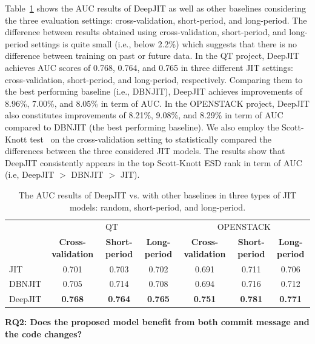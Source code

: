 Table~\ref{tab:results} shows the AUC results of DeepJIT as well as other baselines considering the three evaluation settings: cross-validation, short-period, and long-period. The difference between results obtained using cross-validation, short-period, and long-period settings is quite small (i.e., below 2.2\%) which suggests that there is no difference between training on past or future data. 
In the QT project, DeepJIT achieves AUC scores of 0.768, 0.764, and 0.765 in three different JIT settings: cross-validation, short-period, and long-period, respectively. Comparing them to the best performing baseline (i.e., DBNJIT), DeepJIT achieves improvements of 8.96\%, 7.00\%, and 8.05\% in term of AUC. In the OPENSTACK project, DeepJIT also constitutes improvements of 8.21\%, 9.08\%, and 8.29\% in term of AUC compared to DBNJIT (the best performing baseline). We also employ the Scott-Knott test~\cite{ghotra2015revisiting} on the cross-validation setting to statistically compared the differences between the three considered JIT models. The results show that DeepJIT consistently appears in the top Scott-Knott ESD rank in term of AUC (i.e, DeepJIT $>$ DBNJIT $>$ JIT).  

\begin{table}[t!]
	\centering
	\caption{The AUC results of DeepJIT vs. with other baselines in three types of JIT models: random, short-period, and long-period.}
	\begin{tabular}{|l|c|c|c|c|c|c|}
		\hline
		\multirow{2}[4]{*}{} & \multicolumn{3}{c|}{QT} & \multicolumn{3}{c|}{OPENSTACK} \\
		\cline{2-7}          & \textbf{Cross-validation} & \textbf{Short-period} & \textbf{Long-period} & \textbf{Cross-validation} & \textbf{Short-period} & \textbf{Long-period} \\
		\hline
		\hline
		JIT   & 0.701 & 0.703 & 0.702 & 0.691 & 0.711 & 0.706 \\
		\hline
		DBNJIT & 0.705 & 0.714 & 0.708 & 0.694 & 0.716 & 0.712 \\
		\hline
		DeepJIT & \textbf{0.768} & \textbf{0.764} & \textbf{0.765} & \textbf{0.751} & \textbf{0.781} & \textbf{0.771} \\
		\hline
	\end{tabular}%
	\label{tab:results}%
\end{table}%

\noindent \textbf{RQ2: Does the proposed model benefit from both commit message and the code changes?}

